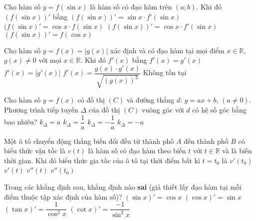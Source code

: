 \begin{ex}%
	Cho hàm số $y=f(\sin x)$ là hàm số có đạo hàm trên $(a;b)$. Khi đó $(f(\sin x))'$ bằng
	\choice
	{$(f(\sin x))'=\sin x \cdot f'(\sin x)$}
	{$(f(\sin x)'=\cos x \cdot f(\sin x)$}
	{\True $(f(\sin x))'=\cos x \cdot f'(\sin x)$}
	{$(f(\sin x))'=f(\cos x)$}
\end{ex}

\begin{ex}%
	Cho hàm số $y=f(x)=|g(x)|$ xác định và có đạo hàm tại mọi điểm $x\in\mathbb{R}$, $g(x)\ne 0$ với mọi $x\in \mathbb{R}$. Khi đó $f'(x)$ bằng
	\choice
	{$f'(x)=g'(x)$}
	{$f'(x)=|g'(x)|$}
	{\True $f'(x)=\dfrac{g(x)\cdot g'(x)}{\sqrt{\left(g(x)\right)^2}}$}
	{Không tồn tại}
\end{ex}

\begin{ex}%
	Cho hàm số $y=f(x)$ có đồ thị $(C)$ và đường thẳng $d$: $y=ax+b$, $(a\ne0)$. Phương trình tiếp tuyến $\Delta$ của đồ thị $(C)$ vuông góc với $d$ có hệ số góc bằng bao nhiêu?
	\choice
	{$k_{\Delta}=a$}
	{$k_{\Delta}=\dfrac{1}{a}$}
	{\True $k_{\Delta}=-\dfrac{1}{a}$}
	{$k_{\Delta}=-a$}
\end{ex}

\begin{ex}%
	Một ô tô chuyển động thẳng biến đổi đều từ thành phố $A$ đến thành phố $B$ có biểu thức vận tốc là $v(t)$ là hàm số có đạo hàm theo biến $t$ với $t\in\mathbb{R}$ và là biến thời gian. Khi đó biểu thức gia tốc của ô tô tại thời điểm bất kì $t=t_0$ là
	\choice
	{\True $v'(t_0)$}
	{$v'(t)$}
	{$v''(t)$}
	{$v''(t_0)$}
\end{ex}

\begin{ex}%
	Trong các khẳng định sau, khẳng định nào \textbf{sai} (giả thiết lấy đạo hàm tại mỗi điểm thuộc tập xác định của hàm số)?
	\choice
	{$ (\sin x)'= \cos x$}
	{\True $ (\cos x)'= \sin x$}
	{$ (\tan x)'= \dfrac{1}{\cos ^2 x} $}
	{ $(\cot x)' = \dfrac{-1}{\sin ^2 x}$}
\end{ex}

